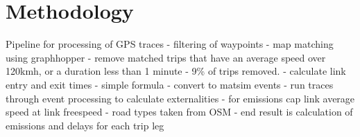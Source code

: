 \section{Methodology}

Pipeline for processing of GPS traces
 - filtering of waypoints
 - map matching using graphhopper
 - remove matched trips that have an average speed over 120kmh, or a duration less than 1 minute - 9\% of trips removed.
 - calculate link entry and exit times - simple formula
 - convert to matsim events
 - run traces through event processing to calculate externalities
 	- for emissions cap link average speed at link freespeed 
 	- road types taken from OSM
 	- end result is calculation of emissions and delays for each trip leg